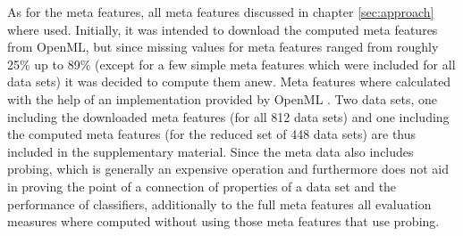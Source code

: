\cite{OpenML2013}
As for the meta features, all meta features discussed in chapter \ref{sec:approach} where used. Initially, it was intended to download the computed meta features from OpenML, but since missing values for meta features ranged from roughly 25\% up to 89\% (except for a few simple meta features which were included for all data sets) it was decided to compute them anew. Meta features where calculated with the help of an implementation provided by OpenML \cite{openMLEvaluationEngine}. Two data sets, one including the downloaded meta features (for all 812 data sets) and one including the computed meta features (for the reduced set of 448 data sets) are thus included in the supplementary material. Since the meta data also includes probing, which is generally an expensive operation and furthermore does not aid in proving the point of a connection of properties of a data set and the performance of classifiers, additionally to the full meta features all evaluation measures where computed without using those meta features that use probing.

